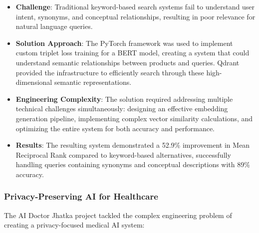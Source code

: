 \documentclass[12pt,a4paper]{article}
\begin{document}
\begin{itemize}
    \item \textbf{Challenge}: Traditional keyword-based search systems fail to understand user intent, synonyms, and conceptual relationships, resulting in poor relevance for natural language queries.
    
    \item \textbf{Solution Approach}: The PyTorch framework was used to implement custom triplet loss training for a BERT model, creating a system that could understand semantic relationships between products and queries. Qdrant provided the infrastructure to efficiently search through these high-dimensional semantic representations.
    
    \item \textbf{Engineering Complexity}: The solution required addressing multiple technical challenges simultaneously: designing an effective embedding generation pipeline, implementing complex vector similarity calculations, and optimizing the entire system for both accuracy and performance.
    
    \item \textbf{Results}: The resulting system demonstrated a 52.9\% improvement in Mean Reciprocal Rank compared to keyword-based alternatives, successfully handling queries containing synonyms and conceptual descriptions with 89\% accuracy.
\end{itemize}

\subsubsection{Privacy-Preserving AI for Healthcare}
The AI Doctor Jhatka project tackled the complex engineering problem of creating a privacy-focused medical AI system:
\end{document}
